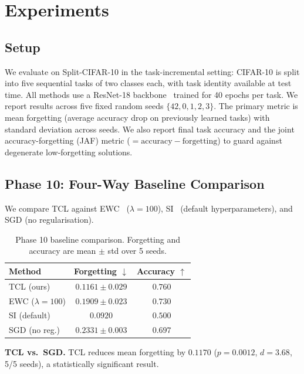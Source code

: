 \section{Experiments}
\label{sec:experiments}

\subsection{Setup}
\label{sec:setup}

We evaluate on Split-CIFAR-10 in the task-incremental setting: CIFAR-10 is split into
five sequential tasks of two classes each, with task identity available at test time.
All methods use a ResNet-18 backbone~\cite{He2016} trained for 40 epochs per task.
We report results across five fixed random seeds $\{42, 0, 1, 2, 3\}$.
The primary metric is mean forgetting (average accuracy drop on previously learned tasks)
with standard deviation across seeds. We also report final task accuracy and the joint
accuracy-forgetting (JAF) metric ($= \text{accuracy} - \text{forgetting}$) to guard
against degenerate low-forgetting solutions.

\subsection{Phase 10: Four-Way Baseline Comparison}
\label{sec:baseline}

We compare TCL against EWC~\cite{Kirkpatrick2017} ($\lambda=100$),
SI~\cite{Zenke2017} (default hyperparameters), and SGD (no regularisation).

\begin{table}[h]
\centering
\caption{Phase 10 baseline comparison. Forgetting and accuracy are mean $\pm$ std over 5 seeds.}
\label{tab:baseline}
\begin{tabular}{lcc}
\toprule
Method & Forgetting $\downarrow$ & Accuracy $\uparrow$ \\
\midrule
TCL (ours)          & $\mathbf{0.1161 \pm 0.029}$ & $0.760$ \\
EWC ($\lambda=100$) & $0.1909 \pm 0.023$ & $0.730$ \\
SI (default)        & $0.0920$ & $0.500$ \\
SGD (no reg.)       & $0.2331 \pm 0.003$ & $0.697$ \\
\bottomrule
\end{tabular}
\end{table}

\textbf{TCL vs.\ SGD.} TCL reduces mean forgetting by $0.1170$
($p = 0.0012$, $d = 3.68$, 5/5 seeds), a statistically significant result.

